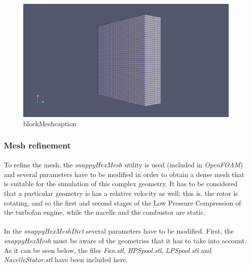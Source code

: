 \begin{figure}[h!]
\includegraphics[scale=0.26]{./mesh/screenshots/blockmesh}
\centering
\caption{blockMeshcaption}
\label{blockMeshcaption}
\end{figure}

\subsubsection{Mesh refinement}

\paragraph{}To refine the mesh, the \textit{snappyHexMesh} utility is used (included in \textit{OpenFOAM}) and several parameters have to be modified in order to obtain a dense mesh that is suitable for the simulation of this complex geometry. It has to be considered that a particular geometry is has a relative velocity as well; this is, the rotor is rotating, and so the first and second stages of the Low Pressure Compression of the turbofan engine, while the nacelle and the combustor are static. 

\paragraph{}In the \textit{snappyHexMeshDict} several parameters have to be modified. First, the \textit{snappyHexMesh} must be aware of the geometries that it has to take into account. As it can be seen below, the files \textit{Fan.stl}, \textit{HPSpool.stl}, \textit{LPSpool.stl} and \textit{NacelleStator.stl} have been included here.

